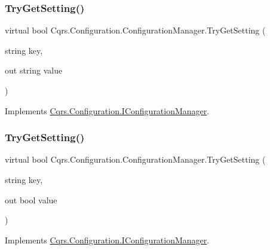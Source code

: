 \mbox{\label{classCqrs_1_1Configuration_1_1ConfigurationManager_ad87af2a011af065d6d3e0d2ff01c7f6e_ad87af2a011af065d6d3e0d2ff01c7f6e}} 
\subsubsection{\texorpdfstring{Try\+Get\+Setting()}{TryGetSetting()}\hspace{0.1cm}{\footnotesize\ttfamily [1/2]}}
{\footnotesize\ttfamily virtual bool Cqrs.\+Configuration.\+Configuration\+Manager.\+Try\+Get\+Setting (\begin{DoxyParamCaption}\item[{string}]{key,  }\item[{out string}]{value }\end{DoxyParamCaption})\hspace{0.3cm}{\ttfamily [virtual]}}



Implements \hyperlink{interfaceCqrs_1_1Configuration_1_1IConfigurationManager_ac4478405e3d9e1c97d14953aea4e695b_ac4478405e3d9e1c97d14953aea4e695b}{Cqrs.\+Configuration.\+I\+Configuration\+Manager}.

\mbox{\label{classCqrs_1_1Configuration_1_1ConfigurationManager_a40810d0b9fd2f3d1c4a270681e908c84_a40810d0b9fd2f3d1c4a270681e908c84}} 
\subsubsection{\texorpdfstring{Try\+Get\+Setting()}{TryGetSetting()}\hspace{0.1cm}{\footnotesize\ttfamily [2/2]}}
{\footnotesize\ttfamily virtual bool Cqrs.\+Configuration.\+Configuration\+Manager.\+Try\+Get\+Setting (\begin{DoxyParamCaption}\item[{string}]{key,  }\item[{out bool}]{value }\end{DoxyParamCaption})\hspace{0.3cm}{\ttfamily [virtual]}}



Implements \hyperlink{interfaceCqrs_1_1Configuration_1_1IConfigurationManager_a8389181330999fcb8e30af4dbb56d35e_a8389181330999fcb8e30af4dbb56d35e}{Cqrs.\+Configuration.\+I\+Configuration\+Manager}.

